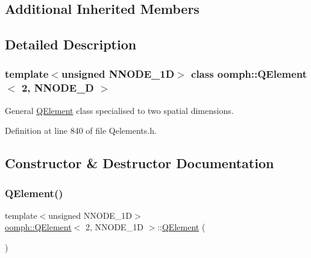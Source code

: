 \subsection*{Additional Inherited Members}


\subsection{Detailed Description}
\subsubsection*{template$<$unsigned N\+N\+O\+D\+E\+\_\+1D$>$\newline
class oomph\+::\+Q\+Element$<$ 2, N\+N\+O\+D\+E\+\_\+D $>$}

General \hyperlink{classoomph_1_1QElement}{Q\+Element} class specialised to two spatial dimensions. 

Definition at line 840 of file Qelements.\+h.



\subsection{Constructor \& Destructor Documentation}
\mbox{\label{classoomph_1_1QElement_3_012_00_01NNODE__1D_01_4_a6437dbbbf374520208a72e1b1b57cf04}} 
\subsubsection{\texorpdfstring{Q\+Element()}{QElement()}\hspace{0.1cm}{\footnotesize\ttfamily [1/2]}}
{\footnotesize\ttfamily template$<$unsigned N\+N\+O\+D\+E\+\_\+1D$>$ \\
\hyperlink{classoomph_1_1QElement}{oomph\+::\+Q\+Element}$<$ 2, N\+N\+O\+D\+E\+\_\+1D $>$\+::\hyperlink{classoomph_1_1QElement}{Q\+Element} (\begin{DoxyParamCaption}{ }\end{DoxyParamCaption})\hspace{0.3cm}{\ttfamily [inline]}}



